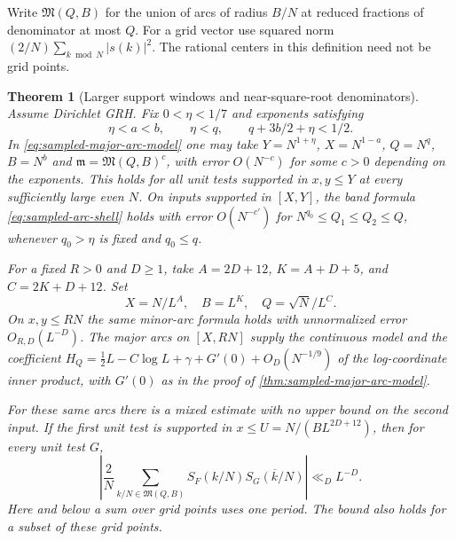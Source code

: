 \documentclass[11pt,a4paper]{article}
\numberwithin{equation}{section}
\newtheorem{theorem}{Theorem}[section]
\begin{document}
Write $\mathfrak M(Q,B)$ for the union of arcs of radius $B/N$
at reduced fractions of denominator at most $Q$. For a grid
vector use squared norm $(2/N)\sum_{k\bmod N}|s(k)|^2$.
The rational centers in this definition need not be grid points.

\begin{theorem}[Larger support windows and near-square-root denominators]
\label{thm:near-root-arcs}
Assume Dirichlet GRH. Fix $0<\eta<1/7$ and exponents satisfying
\[
 \eta<a<b,\qquad \eta<q,\qquad q+3b/2+\eta<1/2 .
\]
In \eqref{eq:sampled-major-arc-model} one may take
$Y=N^{1+\eta}$, $X=N^{1-a}$, $Q=N^q$, $B=N^b$ and
$\mathfrak m=\mathfrak M(Q,B)^c$, with error $O(N^{-c})$ for
some $c>0$ depending on the exponents. This holds for all unit
tests supported in $x,y\le Y$ at every sufficiently large even
$N$. On inputs supported in $[X,Y]$, the band formula
\eqref{eq:sampled-arc-shell} holds with error $O(N^{-c'})$
for $N^{q_0}\le Q_1\le Q_2\le Q$, whenever $q_0>\eta$ is
fixed and $q_0\le q$.

For a fixed $R>0$ and $D\ge1$, take $A=2D+12$, $K=A+D+5$,
and $C=2K+D+12$. Set
\[
 X=N/L^A,\quad B=L^K,\quad Q=\sqrt N/L^C .
\]
On $x,y\le RN$ the same minor-arc formula holds with
unnormalized error $O_{R,D}(L^{-D})$. The major arcs on
$[X,RN]$ supply the continuous model and the coefficient
$H_Q=\tfrac12 L-C\log L+\gamma+G'(0)+O_D(N^{-1/9})$
of the log-coordinate inner product, with $G'(0)$ as in the
proof of \cref{thm:sampled-major-arc-model}.

For these same arcs there is a mixed estimate with no upper
bound on the second input. If the first unit test is supported in
$x\le U=N/(B L^{2D+12})$, then for every unit test $G$,
\begin{equation}
 \left|\frac2N\sum_{k/N\in\mathfrak M(Q,B)}
           S_F(k/N)\overline{S_G(k/N)}\right|\ll_D L^{-D}.
 \label{eq:short-major-unrestricted}
\end{equation}
Here and below a sum over grid points uses one period. The bound
also holds for a subset of these grid points.
\end{theorem}
\end{document}
